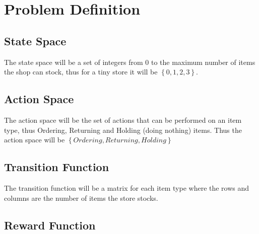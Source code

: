 \documentclass[12pt]{article}
\begin{document}
    \maketitle

    \section{Problem Definition}

    \subsection{State Space}
    The state space will be a set of integers from 0 to the maximum number of items the shop can stock, thus for a tiny store it will be $\left\{0, 1, 2, 3\right\}$.

    \subsection{Action Space}
    The action space will be the set of actions that can be performed on an item type, thus Ordering, Returning and Holding (doing nothing) items. Thus the action space will be $\left\{Ordering, Returning, Holding\right\}$

    \subsection{Transition Function}
    The transition function will be a matrix for each item type where the rows and columns are the number of items the store stocks.

    \subsection{Reward Function}
\end{document}
